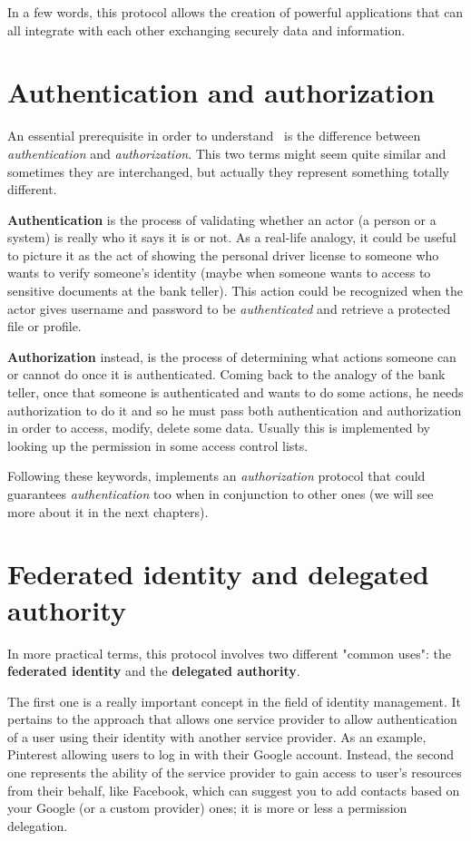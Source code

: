 In a few words, this protocol allows the creation of powerful applications that can all integrate with each other exchanging securely data and information.

\section{Authentication and authorization}
An essential prerequisite in order to understand \oauth\ is the difference between \textit{authentication} and \textit{authorization}. This two terms might seem quite similar and sometimes they are interchanged, but actually they represent something totally different.

\textbf{Authentication} is the process of validating whether an actor (a person or a system) is really who it says it is or not.
As a real-life analogy, it could be useful to picture it as the act of showing the personal driver license to someone who wants to verify someone's identity (maybe when someone wants to access to sensitive documents at the bank teller). 
This action could be recognized when the actor gives username and password to be \textit{authenticated} and retrieve a protected file or profile.

\textbf{Authorization} instead, is the process of determining what actions someone can or cannot do once it is authenticated.
Coming back to the analogy of the bank teller, once that someone is authenticated and wants to do some actions, he needs authorization to do it and so he must pass both authentication and authorization in order to access, modify, delete some data. Usually this is implemented by looking up the permission in some access control lists.

Following these keywords, \textit{\oauth} implements an \textit{authorization} protocol that could guarantees \textit{authentication} too when in conjunction to other ones (we will see more about it in the next chapters).

\section{Federated identity and delegated authority}
In more practical terms, this protocol involves two different "common uses": the \textbf{federated identity} and the \textbf{delegated authority}.

The first one is a really important concept in the field of identity management. It pertains to the approach that allows one service provider to allow authentication of a user using their identity with another service provider. As an example, Pinterest allowing users to log in with their Google account.
Instead, the second one represents the ability of the service provider to gain access to user's resources from their behalf, like Facebook, which can suggest you to add contacts based on your Google (or a custom provider) ones; it is more or less a permission delegation.

